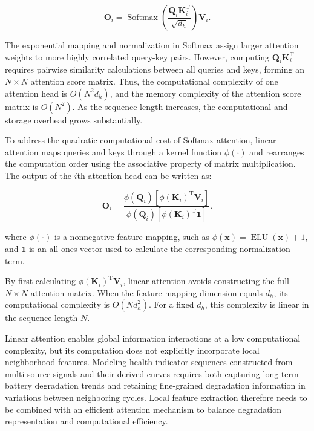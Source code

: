 \begin{equation}
\mathbf O_i
=
\operatorname{Softmax}
\left(
\frac{\mathbf Q_i\mathbf K_i^{\mathrm T}}{\sqrt{d_h}}
\right)
\mathbf V_i.
\label{eq:softmax_attention}
\end{equation}

The exponential mapping and normalization in Softmax assign larger attention weights to more highly correlated query-key pairs. However, computing $\mathbf Q_i\mathbf K_i^{\mathrm T}$ requires pairwise similarity calculations between all queries and keys, forming an $N\times N$ attention score matrix. Thus, the computational complexity of one attention head is $O(N^2d_h)$, and the memory complexity of the attention score matrix is $O(N^2)$. As the sequence length increases, the computational and storage overhead grows substantially\cite{ref39}.

To address the quadratic computational cost of Softmax attention, linear attention maps queries and keys through a kernel function $\phi(\cdot)$ and rearranges the computation order using the associative property of matrix multiplication\cite{ref40}. The output of the $i$th attention head can be written as:

\begin{equation}
\mathbf O_i
=
\frac{
\phi(\mathbf Q_i)
\left[
\phi(\mathbf K_i)^{\mathrm T}\mathbf V_i
\right]
}{
\phi(\mathbf Q_i)
\left[
\phi(\mathbf K_i)^{\mathrm T}\mathbf 1
\right]
}.
\label{eq:linear_attention}
\end{equation}

where $\phi(\cdot)$ is a nonnegative feature mapping, such as $\phi(\mathbf x)=\operatorname{ELU}(\mathbf x)+1$, and $\mathbf 1$ is an all-ones vector used to calculate the corresponding normalization term.

By first calculating $\phi(\mathbf K_i)^{\mathrm T}\mathbf V_i$, linear attention avoids constructing the full $N\times N$ attention matrix. When the feature mapping dimension equals $d_h$, its computational complexity is $O(Nd_h^2)$. For a fixed $d_h$, this complexity is linear in the sequence length $N$.

Linear attention enables global information interactions at a low computational complexity, but its computation does not explicitly incorporate local neighborhood features\cite{ref31,ref39,ref64}. Modeling health indicator sequences constructed from multi-source signals and their derived curves requires both capturing long-term battery degradation trends and retaining fine-grained degradation information in variations between neighboring cycles. Local feature extraction therefore needs to be combined with an efficient attention mechanism to balance degradation representation and computational efficiency.

